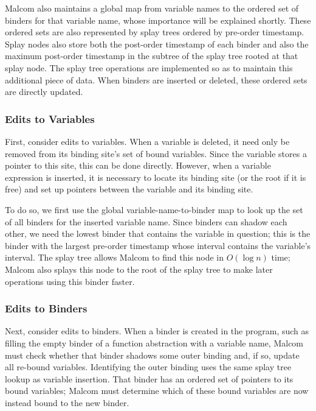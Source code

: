 Malcom also maintains a global map from variable names to the ordered set of binders for that variable name, whose importance will be explained shortly. These ordered sets are also represented by splay trees ordered by pre-order timestamp. Splay nodes also store both the post-order timestamp of each binder and also the maximum post-order timestamp in the subtree of the splay tree rooted at that splay node. The splay tree operations are implemented so as to maintain this additional piece of data. When binders are inserted or deleted, these ordered sets are directly updated.

\subsubsection{Edits to Variables}

First, consider edits to variables.
When a variable is deleted, it need only be removed from its binding site's set of bound variables. Since the variable stores a pointer to this site, this can be done directly. However, when a variable expression is inserted, it is necessary to locate its binding site (or the root if it is free) and set up pointers between the variable and its binding site. 

To do so, we first use the global variable-name-to-binder map to look up the set of all binders for the inserted variable name. Since binders can shadow each other, we need the lowest binder that contains the variable in question; this is the binder with the largest pre-order timestamp whose interval contains the variable's interval. The splay tree allows Malcom to find this node in $O(\log n)$ time; Malcom also splays this node to the root of the splay tree to make later operations using this binder faster.

\subsubsection{Edits to Binders}

Next, consider edits to binders.
When a binder is created in the program, such as filling the empty binder of a function abstraction with a variable name,
Malcom must check whether that binder shadows some outer binding and, if so, update all re-bound variables. Identifying the outer binding uses the same splay tree lookup as variable insertion. That binder has an ordered set of pointers to its bound variables; Malcom must determine which of these bound variables are now instead bound to the new binder.

